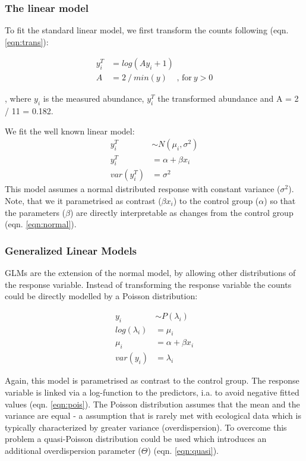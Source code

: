 \documentclass{scrartcl}
\begin{document}
\subsubsection{The linear model}
To fit the standard linear model, we first transform the counts following \citet{van_den_brink_impact_2000} (eqn. \ref{eqn:trans}):

\begin{align}
  y^T_i & = log(Ay_i + 1) \label{eqn:trans} \\
  A & = 2~/~min(y)~~~~~\text{, for}~ y > 0 \nonumber
\end{align}

, where $y_i$ is the measured abundance, $y_i^T$ the transformed abundance and A = 2 / 11 = 0.182.

We fit the well known linear model:
\begin{align}
  y_i^T &\sim N(\mu_i, \sigma^2) \nonumber \\
  y_i^T &= \alpha + \beta x_i \label{eqn:normal} \\
  var(y_i^T) &= \sigma^2 \nonumber
\end{align}
This model assumes a normal distributed response with constant variance ($\sigma^2$).
Note, that we it parametrised as contrast ($\beta x_i$) to the control group ($\alpha$) so that the parameters ($\beta$) are directly interpretable as changes from the control group (eqn. \ref{eqn:normal}).


\subsubsection{Generalized Linear Models}
GLMs are the extension of the normal model, by allowing other distributions of the response variable.
Instead of transforming the response variable the counts could be directly modelled by a Poisson distribution:

\begin{align}
  y_i &\sim P(\lambda_i) \nonumber \\
  log(\lambda_i) &= \mu_i \label{eqn:pois} \\
  \mu_i &= \alpha + \beta x_i \nonumber \\
  var(y_i) &= \lambda_i \nonumber
\end{align}

Again, this model is parametrised as contrast to the control group. 
The response variable is linked via a log-function to the predictors, i.a. to avoid negative fitted values (eqn. \ref{eqn:pois}). 
The Poisson distribution assumes that the mean and the variance are equal - a assumption that is rarely met with ecological data which is typically characterized by greater variance (overdispersion).
To overcome this problem a quasi-Poisson distribution could be used which introduces an additional overdispersion parameter ($\Theta$) (eqn. \ref{eqn:quasi}).
\end{document}
